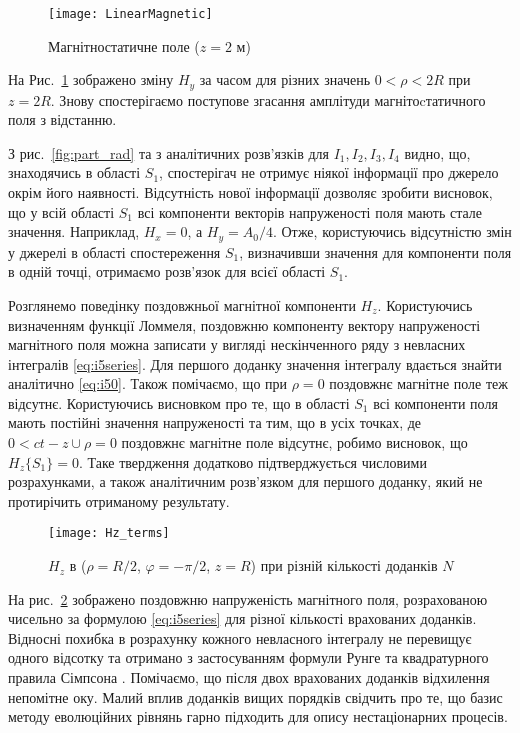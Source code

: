 \begin{figure}[h] \begin{center}
\texttt{[image: LinearMagnetic]}
\caption{Магнітностатичне поле ($ z = 2 $ м)} \label{fig:emp_h_rho}
\end{center} \end{figure}

На Рис.~\ref{fig:emp_h_rho} зображено зміну $ H_y $ за часом для 
різних значень $ 0 < \rho < 2R $ при $ z = 2R $. Знову спостерігаємо 
поступове згасання амплітуди магнітоcтатичного поля з відстанню.

З рис.~\ref{fig:part_rad} та з аналітичних розв'язків для 
$ I_1, I_2, I_3, I_4 $ видно, що, знаходячись в області $ S_1 $, 
спостерігач не отримує ніякої інформації про джерело окрім його наявності.
Відсутність нової інформації дозволяє зробити висновок, що у всій області 
$ S_1 $ всі компоненти векторів напруженості поля мають стале значення.
Наприклад, $ H_x = 0 $, а $ H_y = A_0/4 $. Отже, користуючись відсутністю 
змін у джерелі в області спостереження $ S_1 $, визначивши значення для 
компоненти поля в одній точці, отримаємо розв'язок для всієї області $ S_1 $.  

Розглянемо поведінку поздовжньої магнітної компоненти $ H_z $. Користуючись
визначенням функції Ломмеля, поздовжню компоненту вектору напруженості 
магнітного поля можна записати у вигляді нескінченного ряду з невласних 
інтегралів \eqref{eq:i5series}. Для першого доданку значення інтегралу 
вдається знайти аналітично \eqref{eq:i50}. Також помічаємо, що при 
$ \rho = 0 $ поздовжнє магнітне поле теж відсутнє. Користуючись висновком 
про те, що в області $ S_1 $ всі компоненти поля мають постійні значення 
напруженості та тим, що в усіх точках, де $ 0 < ct - z \cup \rho = 0 $ 
поздовжнє магнітне поле відсутнє, робимо висновок, що $ H_z \{ S_1 \} = 0 $.
Таке твердження додатково підтверджується числовими розрахунками, а також
аналітичним розв'язком для першого доданку, який не протирічить отриманому
результату.

\begin{figure}[h] \begin{center}
\texttt{[image: Hz\_terms]}
\caption{$H_z$ в ($\rho = R/2$, $\varphi = -\pi/2$, $z = R$) при 
різній кількості доданків $ N $} \label{fig:hz_terms}
\end{center} \end{figure}

На рис.~\ref{fig:hz_terms} зображено поздовжню напруженість магнітного поля,
розрахованою чисельно за формулою \eqref{eq:i5series} для різної кількості 
врахованих доданків. Відносні похибка в розрахунку кожного невласного 
інтегралу не перевищує одного відсотку та отримано з застосуванням формули
Рунге \cite{imp:NumRecipes2007} та квадратурного правила Сімпсона 
\cite{imp:NumRecipes2007}. Помічаємо, що після двох врахованих 
доданків відхилення непомітне оку. Малий вплив доданків вищих порядків 
свідчить про те, що базис методу еволюційних рівнянь гарно підходить для 
опису нестаціонарних процесів.

